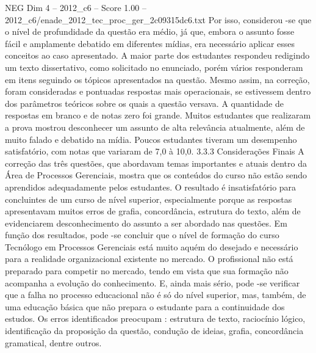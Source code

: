 \begin{textsample}{NEG Dim 4 – 2012\_c6 – Score 1.00 – 2012\_c6/enade\_2012\_tec\_proc\_ger\_2c09315dc6.txt}
Por isso, considerou -se que o nível de profundidade da questão era médio, já que, embora o assunto fosse fácil e amplamente debatido em diferentes mídias, era necessário aplicar esses conceitos ao caso apresentado.
A maior parte dos estudantes respondeu redigindo um texto dissertativo, como solicitado no enunciado, porém vários responderam em itens seguindo os tópicos apresentados na questão.
Mesmo assim, na correção, foram consideradas e pontuadas respostas mais operacionais, se estivessem dentro dos parâmetros teóricos sobre os quais a questão versava.
A quantidade de respostas em branco e de notas zero foi grande.
Muitos estudantes que realizaram a prova mostrou desconhecer um assunto de alta relevância atualmente, além de muito falado e debatido na mídia.
Poucos estudantes tiveram um desempenho satisfatório, com notas que variaram de 7,0 à 10,0. 3.3.3 Considerações Finais A correção das três questões, que abordavam temas importantes e atuais dentro da Área de Processos Gerenciais, mostra que os conteúdos do curso não estão sendo aprendidos adequadamente pelos estudantes.
O resultado é insatisfatório para concluintes de um curso de nível superior, especialmente porque as respostas apresentavam muitos erros de grafia, concordância, estrutura do texto, além de evidenciarem desconhecimento do assunto a ser abordado nas questões.
Em função dos resultados, pode -se concluir que o nível de formação do curso Tecnólogo em Processos Gerenciais está muito aquém do desejado e necessário para a realidade organizacional existente no mercado.
O profissional não está preparado para competir no mercado, tendo em vista que sua formação não acompanha a evolução do conhecimento.
E, ainda mais sério, pode -se verificar que a falha no processo educacional não é só do nível superior, mas, também, de uma educação básica que não prepara o estudante para a continuidade dos estudos.
Os erros identificados preocupam : estrutura de texto, raciocínio lógico, identificação da proposição da questão, condução de ideias, grafia, concordância gramatical, dentre outros.

\end{textsample}
